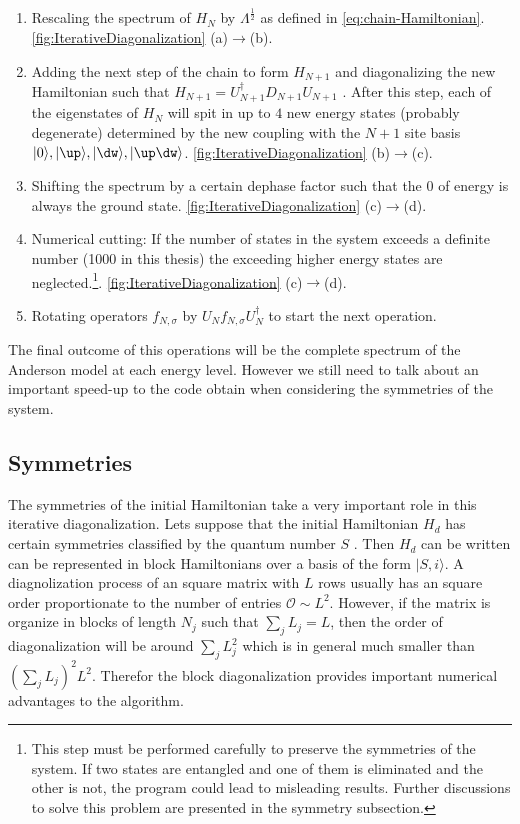 \begin{enumerate}
 	\item Rescaling the spectrum of $H_{N}$ by $\Lambda^{\frac{1}{2}}$ as defined in \ref{eq:chain-Hamiltonian}. \ref{fig:IterativeDiagonalization} (a)$\rightarrow$(b).
 	\item Adding the next step of the chain to form $H_{N+1}$ and diagonalizing the new Hamiltonian such that $H_{N+1} = U_{N+1}^\dagger D_{N+1} U_{N+1}$ . After this step, each of the eigenstates of $H_{N}$ will spit in up to $4$ new energy states (probably degenerate) determined by the new coupling with the  $N+1$ site basis ${\vert 0 \rangle, \vert \up \rangle, \vert \dw \rangle, \vert \up \dw \rangle}$.  \ref{fig:IterativeDiagonalization} (b)$\rightarrow$(c).
 	\item Shifting the spectrum by a certain dephase factor such that the $0$ of energy is always the ground state.  \ref{fig:IterativeDiagonalization} (c)$\rightarrow$(d).
 	\item Numerical cutting: If the number of states in the system exceeds a definite number (1000 in this thesis) the exceeding higher energy states are neglected.\footnote{ This step must be performed carefully to preserve the symmetries of the system. If two states are entangled and one of them is eliminated and the other is not, the program could lead to misleading results. Further discussions to solve this problem are presented in the symmetry subsection.  }. \ref{fig:IterativeDiagonalization} (c)$\rightarrow$(d).
 	\item Rotating operators $f_{N,\sigma}$  by $ U_N f_{N,\sigma} U_N^\dagger$ to start the next operation.
\end{enumerate}

The final outcome of this operations will be the complete spectrum of the Anderson model at each energy level. However we still need to talk about an important speed-up to the code obtain when considering the symmetries of the system. 

\subsection{Symmetries \label{subsec:Syms}}

The symmetries of the initial Hamiltonian take a very important role in this iterative diagonalization. Lets suppose that the initial Hamiltonian $H_d$ has certain symmetries classified by the quantum number $S$ . Then $H_d$ can be written can be represented in block Hamiltonians over a basis of the form $\vert S, i\rangle$. A diagnolization process of an square matrix with $L$ rows usually has an square order proportionate to the number of entries $\mathcal{O}\sim L^2$. However, if the matrix is organize in blocks of length $N_j$  such that $\sum_j L_j = L$, then the order of diagonalization will be around $\sum_j L_j^2  $ which is in general much smaller than $(\sum_j L_j)^2 L^2$. Therefor the block diagonalization provides important numerical advantages to the algorithm. 

